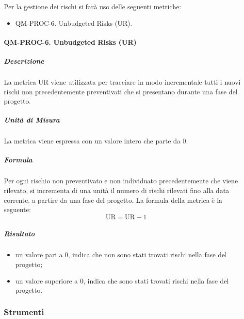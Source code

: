 			Per la gestione dei rischi si farà uso delle seguenti metriche:

			\begin{itemize}
				\item QM-PROC-6. Unbudgeted Risks (UR).
			\end{itemize}

			\paragraph{QM-PROC-6. Unbudgeted Risks (UR)}

				\subparagraph{Descrizione}
				La metrica UR viene utilizzata per tracciare in modo incrementale tutti i nuovi rischi non precedentemente preventivati che si presentano durante una fase del progetto.

				\subparagraph{Unità di Misura}
				La metrica viene espressa con un valore intero che parte da 0.

				\subparagraph{Formula}
				Per ogni rischio non preventivato e non individuato precedentemente che viene rilevato, si incrementa di una unità il numero di rischi rilevati fino alla data corrente, a partire da una fase del progetto.
				La formula della metrica è la seguente:
				\[
					\text{UR} = \text{UR} + 1
				\]

				\subparagraph{Risultato}
				\begin{itemize}
					\item un valore pari a 0, indica che non sono stati trovati rischi nella fase del progetto;
					\item un valore superiore a 0, indica che sono stati trovati rischi nella fase del progetto.
				\end{itemize}

	\subsubsection{Strumenti}

